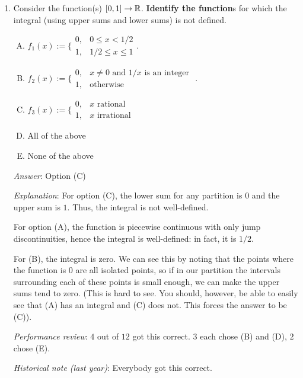\documentclass[10pt]{amsart}
\begin{document}
\begin{enumerate}

\item Consider the function(s) $[0,1] \to \mathbb{R}$. {\bf Identify the
  function}s for which the integral (using upper sums and lower sums)
  is not defined.

  \begin{enumerate}[(A)]
  \item $f_1(x) := \lbrace\begin{array}{rl} 0, & 0 \le x < 1/2 \\ 1, &
    1/2 \le x \le 1\end{array}$.
  \item $f_2(x) := \lbrace\begin{array}{rl} 0, & x \ne 0 \text{ and } 1/x \text{ is an
    integer } \\ 1, & \text{otherwise} \end{array}$.
  \item $f_3(x) := \lbrace\begin{array}{rl} 0, & x \text{ rational }\\
    1, & x \text{ irrational}\end{array}$
  \item All of the above
  \item None of the above
  \end{enumerate}

  {\em Answer}: Option (C)

  {\em Explanation}: For option (C), the lower sum for any partition is $0$
  and the upper sum is $1$. Thus, the integral is not
  well-defined. 

  For option (A), the function is piecewise continuous with
  only jump discontinuities, hence the integral is well-defined: in
  fact, it is $1/2$. 

  For (B), the integral is zero. We can see this by
  noting that the points where the function is $0$ are all isolated
  points, so if in our partition the intervals surrounding each of
  these points is small enough, we can make the upper sums tend to
  zero. (This is hard to see. You should, however, be able to easily
  see that (A) has an integral and (C) does not. This forces the
  answer to be (C)).

  {\em Performance review}: $4$ out of $12$ got this correct. $3$ each
  chose (B) and (D), $2$ chose (E).

  {\em Historical note (last year)}: Everybody got this correct.


\end{enumerate}
\end{document}
